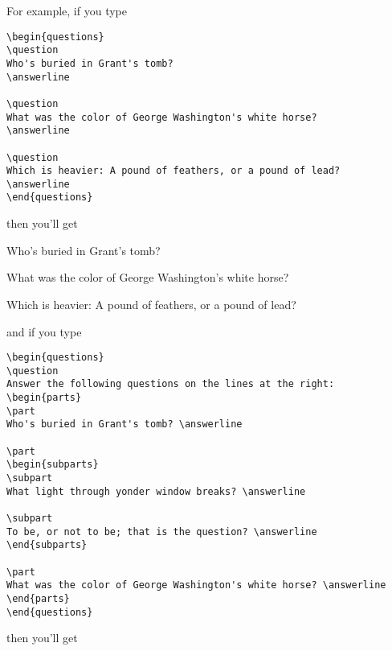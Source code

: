 \documentclass[12pt]{exam}
\begin{document}
For example, if you type
\begin{verbatim}
\begin{questions}
\question
Who's buried in Grant's tomb?
\answerline

\question
What was the color of George Washington's white horse?
\answerline

\question
Which is heavier: A pound of feathers, or a pound of lead?
\answerline
\end{questions}
\end{verbatim}
then you'll get
\begin{questions}
\question
Who's buried in Grant's tomb?
\answerline

\question
What was the color of George Washington's white horse?
\answerline

\question
Which is heavier: A pound of feathers, or a pound of lead?
\answerline
\end{questions}
and if you type
\begin{verbatim}
\begin{questions}
\question
Answer the following questions on the lines at the right:  
\begin{parts}
\part
Who's buried in Grant's tomb? \answerline
  
\part
\begin{subparts}
\subpart
What light through yonder window breaks? \answerline

\subpart
To be, or not to be; that is the question? \answerline
\end{subparts}
  
\part
What was the color of George Washington's white horse? \answerline
\end{parts}
\end{questions}
\end{verbatim}
then you'll get
\end{document}
